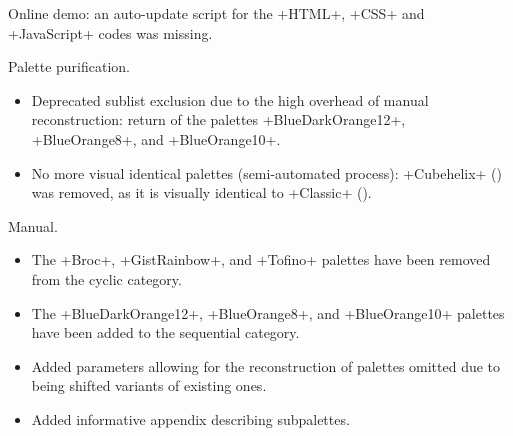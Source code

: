 \documentclass{tutodoc}
\begin{document}
\small

\begin{tdocfix}
    \item Online demo: an auto-update script for the +HTML+, +CSS+ and +JavaScript+ codes was missing.
\end{tdocfix}




\begin{tdocbreak}
    \item Palette purification.
    \begin{itemize}
        \item Deprecated sublist exclusion due to the high overhead of manual reconstruction:
        return of the palettes +BlueDarkOrange12+, +BlueOrange8+, and +BlueOrange10+.


        \item No more visual identical palettes (semi-automated process):
        +Cubehelix+ (\matplotlib) was removed, as it is visually identical to +Classic+ (\cubehelix).
    \end{itemize}
\end{tdocbreak}




\begin{tdocupdate}
    \item Manual.
    \begin{itemize}
        \item The +Broc+, +GistRainbow+, and +Tofino+ palettes have been removed from the cyclic category.


        \item The +BlueDarkOrange12+, +BlueOrange8+, and +BlueOrange10+ palettes have been added to the sequential category.


        \item Added parameters allowing for the reconstruction of palettes omitted due to being shifted variants of existing ones.


        \item Added informative appendix describing subpalettes.
    \end{itemize}
\end{tdocupdate}
\end{document}
